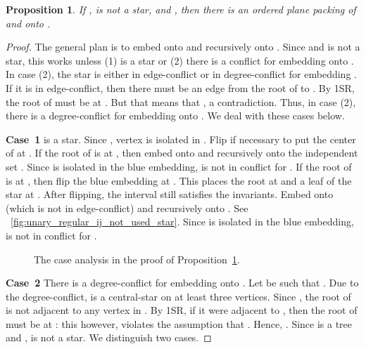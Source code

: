 \documentclass[11pt,a4paper,colorlinks=true,urlcolor=blue,citecolor=red]{article}
\theoremstyle{plain}
\newtheorem{proposition}[theorem]{Proposition}
\newcommand{\case}[1]{\par\vspace{.5\baselineskip}\noindent\textbf{\sffamily Case~#1}}
\begin{document}
\begin{proposition}\label{prop:rec_unary_regular_ij_not_used}
  If ,  is not a star, and
  , then there is an ordered plane packing
  of  and  onto .
\end{proposition}
\begin{proof}
  The general plan is to embed  onto  and  recursively onto
  . Since  and  is not a star,
  this works unless (1)  is a star or (2) there is a
  conflict for embedding  onto . In case (2), the star
   is either in edge-conflict or in
  degree-conflict for embedding . If it is in edge-conflict, then
  there must be an edge from the root of  to . By 1SR, the root
  of  must be at . But that means that
  , a contradiction. Thus, in case (2), there
  is a degree-conflict for embedding  onto . We deal with
  these cases below.

  \case{1}  is a star. Since , vertex 
  is isolated in . Flip  if necessary to put the
  center of  at . If the root of  is at ,
  then embed  onto  and  recursively onto the independent set
  . Since  is isolated in the blue embedding,  is
  not in conflict for . If the root of  is at , then
  flip the blue embedding at . This places the root at 
  and a leaf of the star at . After flipping, the interval 
  still satisfies the invariants. Embed  onto  (which is not in
  edge-conflict) and  recursively onto . See
  \figurename~\ref{fig:unary_regular_ij_not_used_star}. Since  is
  isolated in the blue embedding,  is not in conflict for .

  \begin{figure}[b]
    \centering
    \hfil
    \hfil
    \hfil
    \hfil
    \caption{The case analysis in the proof of
      Proposition~\ref{prop:rec_unary_regular_ij_not_used}.}
    \label{fig:unary_regular_ij_not_uses}
  \end{figure}

  \case{2} There is a degree-conflict for embedding  onto .
  Let  be such that . Due to the
  degree-conflict,  is a central-star on at least three
  vertices. Since , the root of  is
  not adjacent to any vertex in . By 1SR, if it were adjacent
  to , then the root of  must be at : this however,
  violates the assumption that . Hence,
  . Since  is a tree and ,
   is not a star. We distinguish two cases.


\end{proof}
\end{document}
